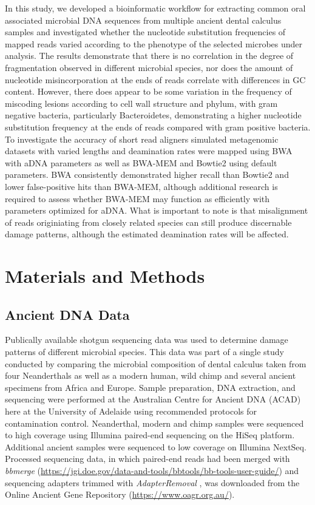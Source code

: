 \documentclass[12pt, a4paper]{article}
\begin{document}
In this study, we developed a bioinformatic workflow for extracting common oral associated microbial DNA sequences from multiple ancient dental calculus samples and investigated whether the nucleotide substitution frequencies of mapped reads varied according to the phenotype of the selected microbes under analysis. 
The results demonstrate that there is no correlation in the degree of fragmentation observed in different microbial species, nor does the amount of nucleotide misincorporation at the ends of reads correlate with differences in GC content. 
However, there does appear to be some variation in the frequency of miscoding lesions according to cell wall structure and phylum, with gram negative bacteria, particularly Bacteroidetes, demonstrating a higher nucleotide substitution frequency at the ends of reads compared with gram positive bacteria.
To investigate the accuracy of short read aligners simulated metagenomic datasets with varied lengths and deamination rates were mapped using BWA with aDNA parameters as well as BWA-MEM and Bowtie2 using default parameters. 
BWA consistently demonstrated higher recall than Bowtie2 and lower false-positive hits than BWA-MEM, although additional research is required to assess whether BWA-MEM may function as efficiently with parameters optimized for aDNA.
What is important to note is that misalignment of reads originiating from closely related species can still produce discernable damage patterns, although the estimated deamination rates will be affected.
\clearpage

\section{Materials and Methods}\label{sec:methods}

\subsection{Ancient DNA Data} %

Publically available shotgun sequencing data was used to determine damage patterns of different microbial species. 
This data was part of a single study conducted by  comparing the microbial composition of dental calculus taken from four Neanderthals as well as a modern human, wild chimp and several ancient specimens from Africa and Europe. 
Sample preparation, DNA extraction, and sequencing were performed at the Australian Centre for Ancient DNA (ACAD) here at the University of Adelaide using recommended protocols for contamination control.
Neanderthal, modern and chimp samples were sequenced to high coverage using Illumina paired-end sequencing on the HiSeq platform. 
Additional ancient samples were sequenced to low coverage on Illumina NextSeq. 
Processed sequencing data, in which paired-end reads had been merged with \textit{bbmerge} (\url{https://jgi.doe.gov/data-and-tools/bbtools/bb-tools-user-guide/}) and sequencing adapters trimmed with \textit{AdapterRemoval} \cite{Lindgreen:2012aa}, was downloaded from the Online Ancient Gene Repository (\url{https://www.oagr.org.au/}). 
\end{document}
